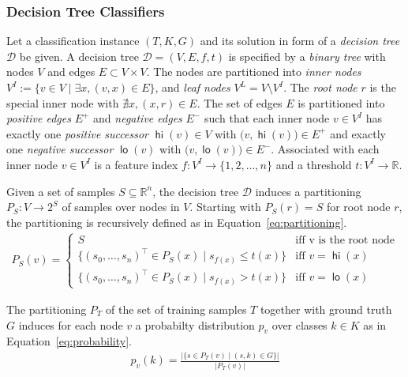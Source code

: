 \documentclass[a4paper, USenglish, cleveref, autoref, thm-restate]{lipics-v2021}
\DeclareMathOperator\hi{\ensuremath{\mathsf{hi}}}
\DeclareMathOperator\lo{\ensuremath{\mathsf{lo}}}
\theoremstyle{definition}
\begin{document}
\subsubsection{Decision Tree Classifiers}
\label{sec:prelim:dt}

\newcommand{\innernodes}{\ensuremath{V^{\!I}}}
\newcommand{\leafnodes}{\ensuremath{V^{\!L}}}
\newcommand{\edgesH}{\ensuremath{E^+}}
\newcommand{\edgesL}{\ensuremath{E^-}}

Let a classification instance $(T, K, G)$ and its solution in form of a \emph{decision tree} $\mathcal{D}$ be given. 
A decision tree $\mathcal{D} = (V, E, f, t)$ is specified by a \emph{binary tree} with nodes $V$ and edges $E \subset V \times V$. 
The nodes are partitioned into \emph{inner nodes} $\innernodes := \{ v \in V \mid \exists x, (v,x) \in E\}$, and \emph{leaf nodes} $\leafnodes = V \setminus \innernodes$. 
The \emph{root node} $r$ is the special inner node with $\nexists x, (x,r) \in E$. 
The set of edges $E$ is partitioned into \emph{positive edges} $\edgesH$ and \emph{negative edges} $\edgesL$ such that each inner node $v \in \innernodes$ has exactly one \emph{positive successor} $\hi(v) \in V$ with $\bigl(v, \hi(v)\bigr) \in \edgesH$ and exactly one \emph{negative successor} $\lo(v)$ with $\bigl(v, \lo(v)\bigr) \in \edgesL$. 
Associated with each inner node $v \in \innernodes$ is a feature index $f : \innernodes \rightarrow \{1, 2, \dots, n\}$ and a threshold $t : \innernodes \rightarrow \mathbb{R}$. 

Given a set of samples $S \subseteq \mathbb{R}^n$, the decision tree $\mathcal{D}$ induces a partitioning $P_S : V \rightarrow 2^S$ of samples over nodes in $V$. 
Starting with $P_S(r) = S$ for root node $r$, the partitioning is recursively defined as in Equation~\ref{eq:partitioning}. 
\begin{align}
\label{eq:partitioning}
P_S(v) = \begin{cases}
S & \text{iff v is the root node}\\
\bigl\{(s_0, \dots, s_n)^{\intercal} \in P_S(x) \mid s_{\!f\!(\!x\!)} \leq t(x)\bigr\} & \text{iff }v=\hi(x)\\
\bigl\{(s_0, \dots, s_n)^{\intercal} \in P_S(x) \mid s_{\!f\!(\!x\!)} > t(x)\bigr\} & \text{iff }v=\lo(x)
\end{cases}
\end{align}

The partitioning $P_T$ of the set of training samples $T$ together with ground truth $G$ induces for each node $v$ a probabilty distribution $p_v$ over classes $k \in K$ as in Equation~\ref{eq:probability}. 
\begin{align}
\label{eq:probability}
p_v(k) = \frac{\bigl| \{ s \in P_T(v) \mid (s, k) \in G \} \bigr|}{\bigl|P_T(v)\bigr|}
\end{align}
\end{document}
